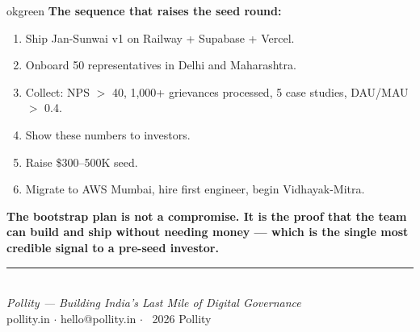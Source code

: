 \documentclass[12pt, a4paper]{article}
\begin{document}
\begin{insightbox}{okgreen}
\textbf{The sequence that raises the seed round:}
\begin{enumerate}[leftmargin=1.5em, itemsep=0.2em]
    \item Ship Jan-Sunwai v1 on Railway + Supabase + Vercel.
    \item Onboard 50 representatives in Delhi and Maharashtra.
    \item Collect: NPS $>$ 40, 1,000+ grievances processed, 5 case studies, DAU/MAU $>$ 0.4.
    \item Show these numbers to investors.
    \item Raise \$300--500K seed.
    \item Migrate to AWS Mumbai, hire first engineer, begin Vidhayak-Mitra.
\end{enumerate}
\textbf{The bootstrap plan is not a compromise. It is the proof that the team can build
and ship without needing money --- which is the single most credible signal to a pre-seed investor.}
\end{insightbox}

\vfill
\begin{center}
    {\color{midgray}\rule{0.5\linewidth}{0.5pt}}\\[0.3cm]
    {\small\itshape Pollity --- Building India's Last Mile of Digital Governance}\\
    {\small pollity.in \quad $\cdot$ \quad hello@pollity.in \quad $\cdot$ \quad \textcopyright\ 2026 Pollity}
\end{center}
\end{document}
